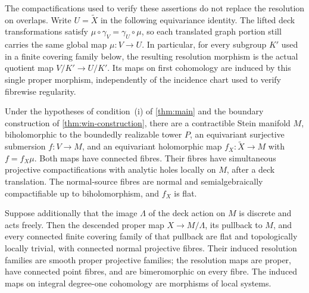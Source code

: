 The compactifications used to verify these assertions do not replace the resolution on overlaps. Write $U=\widetilde X$ in the following equivariance identity. The lifted deck transformations satisfy $\mu\circ\gamma_V=\gamma_U\circ\mu$, so each translated graph portion still carries the same global map $\mu:V\to U$. In particular, for every subgroup $K'$ used in a finite covering family below, the resulting resolution morphism is the actual quotient map $V/K'\to U/K'$. Its maps on first cohomology are induced by this single proper morphism, independently of the incidence chart used to verify fibrewise regularity.

\begin{theorem}\label{thm:quo-projection}
Under the hypotheses of condition~\textup{(i)} of \cref{thm:main} and the boundary construction of \cref{thm:win-construction}, there are a contractible Stein manifold $M$, biholomorphic to the boundedly realizable tower $P$, an equivariant surjective submersion $f:V\to M$, and an equivariant holomorphic map $f_X:\widetilde X\to M$ with $f=f_X\mu$. Both maps have connected fibres. Their fibres have simultaneous projective compactifications with analytic holes locally on $M$, after a deck translation. The normal-source fibres are normal and semialgebraically compactifiable up to biholomorphism, and $f_X$ is flat.

Suppose additionally that the image $\Lambda$ of the deck action on $M$ is discrete and acts freely. Then the descended proper map $X\to M/\Lambda$, its pullback to $M$, and every connected finite covering family of that pullback are flat and topologically locally trivial, with connected normal projective fibres. Their induced resolution families are smooth proper projective families; the resolution maps are proper, have connected point fibres, and are bimeromorphic on every fibre. The induced maps on integral degree-one cohomology are morphisms of local systems.
\end{theorem}
